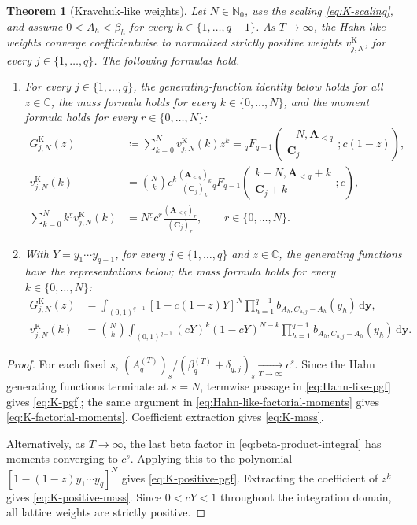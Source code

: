 \documentclass[10pt]{amsart}
\newcommand{\Nzero}{\mathbb N_0}
\newcommand{\dd}{\,\mathrm d}
\newcommand{\A}{\boldsymbol A}
\newcommand{\fall}[2]{#1^{\underline{#2}}}
\newcommand{\pFq}[5]{{}_{#1}F_{#2}\!\left(\begin{matrix}#3\\#4\end{matrix};#5\right)}
\theoremstyle{plain}
\newtheorem{theorem}{Theorem}[section]
\theoremstyle{definition}
\theoremstyle{remark}
\begin{document}
\begin{theorem}[Kravchuk-like weights]
\label{thm:K-rows}
Let \(N\in\Nzero\), use the scaling \eqref{eq:K-scaling}, and assume
\(0<A_h<\beta_h\) for every \(h\in\{1,\ldots,q-1\}\). As
\(T\to\infty\), the Hahn-like weights converge
coefficientwise to normalized strictly positive weights
\(v_{j,N}^{\mathrm K}\), for every \(j\in\{1,\ldots,q\}\). The following
formulas hold.
\begin{enumerate}[label=\textup{(\roman*)}]
\item For every \(j\in\{1,\ldots,q\}\), the generating-function identity
below holds for all \(z\in\mathbb C\), the mass formula holds for every
\(k\in\{0,\ldots,N\}\), and the moment formula holds for every
\(r\in\{0,\ldots,N\}\):
\begin{align}
 G_{j,N}^{\mathrm K}(z)
 &\coloneq\sum_{k=0}^Nv_{j,N}^{\mathrm K}(k)z^k
 =\pFq{q}{q-1}
 {-N,\A_{<q}}{\boldsymbol C_j}{c(1-z)},
 \label{eq:K-pgf}\\
 v_{j,N}^{\mathrm K}(k)
 &=\binom Nk c^k
 \frac{(\A_{<q})_k}{(\boldsymbol C_j)_k}
 \pFq{q}{q-1}
 {k-N,\A_{<q}+k}{\boldsymbol C_j+k}{c},
 \label{eq:K-mass}\\
 \sum_{k=0}^N\fall{k}{r}v_{j,N}^{\mathrm K}(k)
 &=\fall{N}{r}c^r
 \frac{(\A_{<q})_r}{(\boldsymbol C_j)_r},
 \qquad r\in\{0,\ldots,N\}.
 \label{eq:K-factorial-moments}
\end{align}
\item With \(Y=y_1\cdots y_{q-1}\), for every
\(j\in\{1,\ldots,q\}\) and \(z\in\mathbb C\), the generating functions
have the representations below; the mass formula holds for every
\(k\in\{0,\ldots,N\}\):
\begin{align}
 G_{j,N}^{\mathrm K}(z)
 &=
 \int_{(0,1)^{q-1}}
 [1-c(1-z)Y]^N
 \prod_{h=1}^{q-1}b_{A_h,C_{h,j}-A_h}(y_h)
 \dd\boldsymbol y,
 \label{eq:K-positive-pgf}\\
 v_{j,N}^{\mathrm K}(k)
 &=
 \binom Nk
 \int_{(0,1)^{q-1}}
 (cY)^k(1-cY)^{N-k}
 \prod_{h=1}^{q-1}b_{A_h,C_{h,j}-A_h}(y_h)
 \dd\boldsymbol y.
 \label{eq:K-positive-mass}
\end{align}
\end{enumerate}
\end{theorem}

\begin{proof}
For each fixed \(s\),
\((A_q^{(T)})_s/(\beta_q^{(T)}+\delta_{q,j})_s
\xrightarrow[T\to\infty]{} c^s\).
Since the Hahn generating functions terminate at \(s=N\), termwise
passage in \eqref{eq:Hahn-like-pgf} gives \eqref{eq:K-pgf}; the same
argument in \eqref{eq:Hahn-like-factorial-moments} gives
\eqref{eq:K-factorial-moments}. Coefficient extraction gives
\eqref{eq:K-mass}.

Alternatively, as \(T\to\infty\), the last beta factor in
\eqref{eq:beta-product-integral} has moments converging to \(c^s\).
Applying this to the polynomial
\([1-(1-z)y_1\cdots y_q]^N\) gives
\eqref{eq:K-positive-pgf}. Extracting the coefficient of \(z^k\) gives
\eqref{eq:K-positive-mass}. Since \(0<cY<1\) throughout the integration
domain, all lattice weights are strictly positive.
\end{proof}
\end{document}
